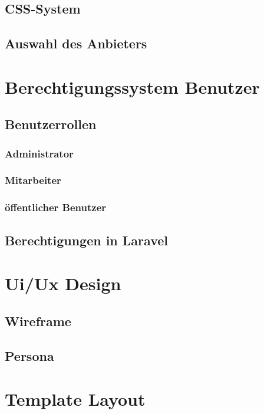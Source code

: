 \subsection{CSS-System}

\subsection{Auswahl des Anbieters}


\section{Berechtigungssystem Benutzer}

\subsection{Benutzerrollen}

\subsubsection{Administrator}
\subsubsection{Mitarbeiter}
\subsubsection{öffentlicher Benutzer}

\subsection{Berechtigungen in Laravel}


\section{Ui/Ux Design}

\subsection{Wireframe}

\subsection{Persona}


\section{Template Layout}

